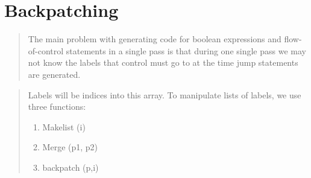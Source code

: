 \section {Backpatching}
\begin {quote}
The main problem with generating code for boolean expressions and flow-of-control statements in a single pass is that during one single pass we may not know the labels that control must go to at the time jump statements are generated.  
\end{quote}

\begin{quote}
Labels will be indices into this array.  To manipulate lists of labels, we use three functions:
\begin{enumerate}
\item Makelist (i)
\item Merge  (p1, p2) 
\item backpatch (p,i)
\end{enumerate}

\end{quote}